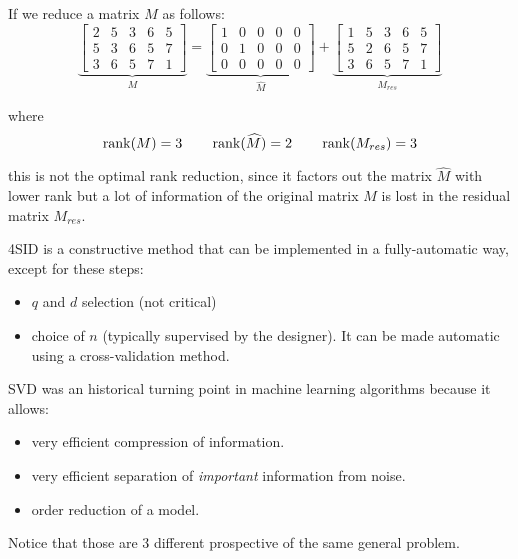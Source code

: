 \begin{exa}
    
    If we reduce a matrix $M$ as follows: 
    \[
        \underbrace{\begin{bmatrix}
            2 & 5 & 3 & 6 & 5 \\
            5 & 3 & 6 & 5 & 7 \\
            3 & 6 & 5 & 7 & 1
        \end{bmatrix}}_{M}
        =
        \underbrace{\begin{bmatrix}
            1 & 0 & 0 & 0 & 0 \\
            0 & 1 & 0 & 0 & 0 \\
            0 & 0 & 0 & 0 & 0
        \end{bmatrix}}_{\hat{M}}
        +
        \underbrace{
        \begin{bmatrix}
            1 & 5 & 3 & 6 & 5 \\
            5 & 2 & 6 & 5 & 7 \\
            3 & 6 & 5 & 7 & 1
        \end{bmatrix}}_{M_{res}}
    \]

    where
    \[ \operatorname*{rank}(M) = 3 \qquad \operatorname*{rank}(\widehat{M}) = 2 \qquad \operatorname*{rank}(M_{res}) = 3 \]

    this is not the optimal rank reduction, since it factors out the matrix $\hat{M}$ with lower rank but a lot of information of the original matrix $M$ is lost in the residual matrix $M_{res}$.
\end{exa}


\begin{rem}
    4SID is a constructive method that can be implemented in a fully-automatic way, except for these steps:
    \begin{itemize}
        \item $q$ and $d$ selection (not critical)
        \item choice of $n$ (typically supervised by the designer). It can be made automatic using a cross-validation method.
    \end{itemize}
\end{rem}

\begin{rem}
    SVD was an historical turning point in machine learning algorithms because it allows:
    \begin{itemize}
        \item very efficient compression of information.
        \item very efficient separation of \emph{important} information from noise.
        \item order reduction of a model.
    \end{itemize}
    Notice that those are 3 different prospective of the same general problem.
\end{rem}
